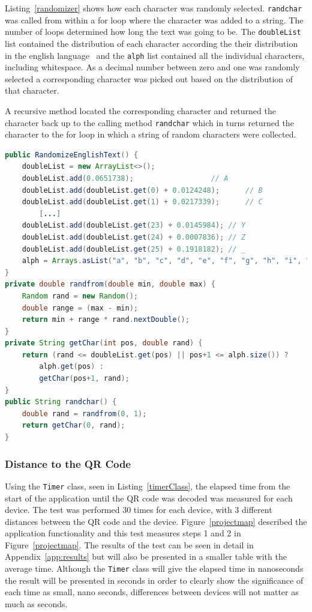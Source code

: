Listing~\ref{randomizer} shows how each character was randomly selected. \texttt{randchar} was called from within a for loop where the character was added to a string. The number of loops determined how long the text was going to be. The \texttt{doubleList} list contained the distribution of each character according the their distribution in the english language~\cite{englishTextStat} and the \texttt{alph} list contained all the individual characters, including whitespace. As a decimal number between zero and one was randomly selected a corresponding character was picked out based on the distribution of that character.

A recursive method located the corresponding character and returned the character back up to the calling method \texttt{randchar} which in turns returned the character to the for loop in which a string of random characters were collected.

\newpage
\begin{lstlisting}[language=Java, caption={The randomizer class}, label=randomizer]
public RandomizeEnglishText() {
	doubleList = new ArrayList<>();
	doubleList.add(0.0651738);					// A
	doubleList.add(doubleList.get(0) + 0.0124248);		// B
	doubleList.add(doubleList.get(1) + 0.0217339);		// C
		[...]
	doubleList.add(doubleList.get(23) + 0.0145984);	// Y
	doubleList.add(doubleList.get(24) + 0.0007836);	// Z
	doubleList.add(doubleList.get(25) + 0.1918182);	// _
	alph = Arrays.asList("a", "b", "c", "d", "e", "f", "g", "h", "i", "j", "k", "k", "m", "n", "o", "p", "q", "r", "s", "t", "u", "v", "w", "x", "y", "z", " ");
}
private double randfrom(double min, double max) {
	Random rand = new Random();
	double range = (max - min);
	return min + range * rand.nextDouble();
}
private String getChar(int pos, double rand) {
	return (rand <= doubleList.get(pos) || pos+1 <= alph.size()) ?
		alph.get(pos) :
		getChar(pos+1, rand);
}
public String randchar() {
	double rand = randfrom(0, 1);
	return getChar(0, rand);
}
\end{lstlisting}

\subsubsection{Distance to the QR Code}

Using the \texttt{Timer} class, seen in Listing~\ref{timerClass}, the elapsed time from the start of the application until the QR code was decoded was measured for each device. The test was performed 30 times for each device, with 3 different distances between the QR code and the device. Figure~\ref{projectmap} described the application functionality and this test measures steps 1 and 2 in Figure~\ref{projectmap}. The results of the test can be seen in detail in Appendix~\ref{app:results} but will also be presented in a smaller table with the average time. 
Although the \texttt{Timer} class will give the elapsed time in nanoseconds the result will be presented in seconds in order to clearly show the significance of each time as small, nano seconds, differences between devices will not matter as much as seconds.

